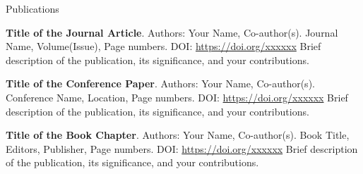 \begin{rubric}{Publications}

\entry*[Year]%
    \normalsize\textbf{Title of the Journal Article}.
    Authors: Your Name, Co-author(s).
    Journal Name, Volume(Issue), Page numbers.
    DOI: \url{https://doi.org/xxxxxx} 
    Brief description of the publication, its significance, and your contributions. \par

\entry*[Year]%
    \normalsize\textbf{Title of the Conference Paper}. 
    Authors: Your Name, Co-author(s). 
    Conference Name, Location, Page numbers. 
    DOI: \url{https://doi.org/xxxxxx} 
    Brief description of the publication, its significance, and your contributions. \par

\entry*[Year]%
    \normalsize\textbf{Title of the Book Chapter}. 
    Authors: Your Name, Co-author(s). 
    Book Title, Editors, Publisher, Page numbers. 
    DOI: \url{https://doi.org/xxxxxx} 
    Brief description of the publication, its significance, and your contributions. \par

\end{rubric}